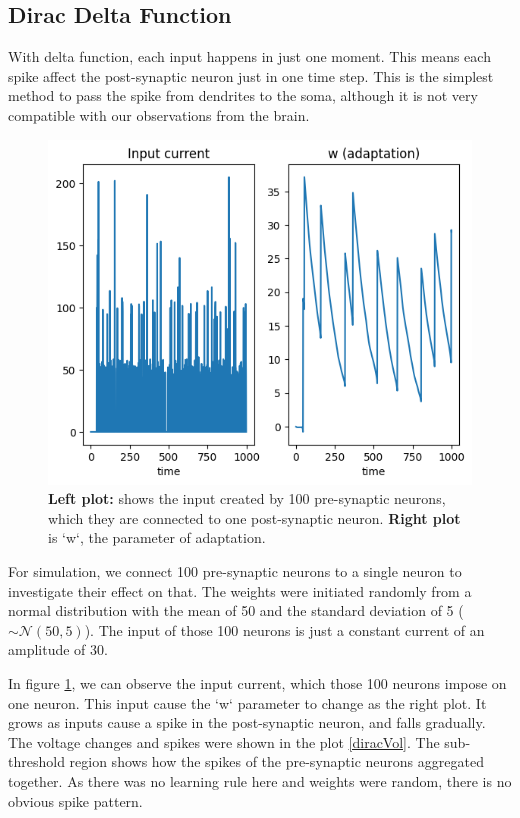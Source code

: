 \documentclass{article}
\begin{document}
	\subsection{Dirac Delta Function}
	With delta function, each input happens in just one moment. This means each spike affect the post-synaptic neuron just in one time step. This is the simplest method to pass the spike from dendrites to the soma, although it is not very compatible with our observations from the brain.\\
	\begin{figure}[h]
		\includegraphics[width=\textwidth]{input1.png}
		\caption{\textbf{Left plot: }shows the input created by 100 pre-synaptic neurons, which they are connected to one post-synaptic neuron. \textbf{Right plot } is `w`, the parameter of adaptation.}
		\label{diracInp}
	\end{figure}
	
	For simulation, we connect 100 pre-synaptic neurons to a single neuron to investigate their effect on that. The weights were initiated randomly from a normal distribution with the mean of 50 and the standard deviation of 5 ($\sim \mathcal{N}(50, 5)$). The input of those 100 neurons is just a constant current of an amplitude of 30.
	
	In figure \ref{diracInp}, we can observe the input current, which those 100 neurons impose on one neuron. This input cause the `w` parameter to change as the right plot. It grows as inputs cause a spike in the post-synaptic neuron, and falls gradually. The voltage changes and spikes were shown in the plot \ref{diracVol}. The sub-threshold region shows how the spikes of the pre-synaptic neurons aggregated together. As there was no learning rule here and weights were random, there is no obvious spike pattern.
	
\end{document}
